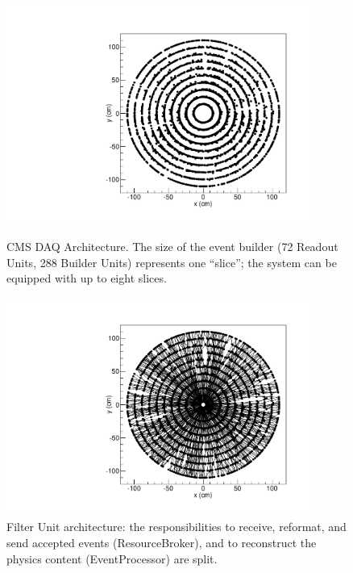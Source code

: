 \documentclass{JINST}
\begin{document}
\begin{figure}[!Hhtb]
\begin{minipage}[t]{8.0cm}
\begin{center}
	\includegraphics[width=0.9\textwidth]{figs/curved_500events_hits.pdf}
	\caption{CMS DAQ Architecture. The size  of the event builder (72 Readout
Units, 288  Builder Units) represents one “slice”; the  system can be equipped
with up to eight slices. \label{fig:hltarc}}
	\end{center}
\end{minipage}
\begin{minipage}[t]{8.0cm}
\begin{center}
	\includegraphics[width=0.9\textwidth]{figs/curved_500events_hits_tracks.pdf}
	\caption{Filter Unit architecture: the responsibilities to receive, reformat, and
send accepted events (ResourceBroker), and to reconstruct the physics content
(EventProcessor) are split.  \label{fig:fu}}
	\end{center}
\end{minipage}
\end{figure}
\end{document}
